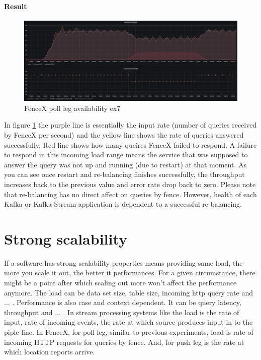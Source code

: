 \documentclass[a4]{report}
\begin{document}
    \paragraph{Result}
    \begin{figure}[ht]
        \caption{FenceX poll leg availability ex7}
        \label{fig:ex7}
        \includegraphics[scale=0.4]{images/evaluation/ex7-benchmarking-ongoing-2per10sec.png}
    \end{figure}

    In figure \ref{fig:ex7} the purple line is essentially the input rate (number of queries received by FenceX per
    second) and the yellow line shows the rate of queries answered successfully.
    Red line shows how many queires FenceX failed to respond.
    A failure to respond in this incoming load range means the service that was supposed to answer the query was not
    up and running (due to restart) at that moment.
    As you can see once restart and re-balancing finishes successfully, the throughput increases back to the previous
    value and error rate drop back to zero.
    Please note that re-balancing has no direct affect on queries by fence.
    However, health of each Kafka or Kafka Stream application is dependent to a successful re-balancing.


    \section{Strong scalability}
    If a software has strong scalability properties means providing same load, the more you scale it out, the better
    it performances.
    For a given circumstance, there might be a point after which scaling out more won't affect the performance anymore.
    The load can be data set size, table size, incoming http query rate and ... .
    Performance is also case and context dependent.
    It can be query latency, throughput and ... .
    In stream processing systems like the load is the rate of input, rate of incoming events, the rate at
    which source produces input in to the piple line.
    In FenceX, for poll leg, similar to previous experiments, load is rate of incoming HTTP requests for queries by
    fence.
    And, for push leg is the rate at which location reports arrive.
\end{document}
